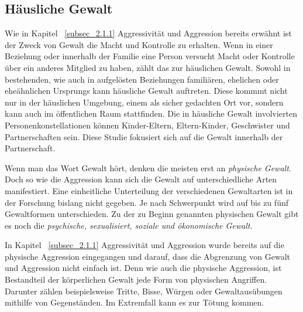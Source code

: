 \subsection{Häusliche Gewalt}    \label{subsec_2.1.2}
Wie in Kapitel ~\ref{subsec_2.1.1} Aggressivität und Aggression bereits erwähnt ist der Zweck von 
Gewalt die Macht und Kontrolle zu erhalten. %
Wenn in einer Beziehung oder innerhalb der Familie eine Person versucht Macht oder Kontrolle
über ein anderes Mitglied zu haben, zählt das zur häuslichen Gewalt. Sowohl in bestehenden, wie 
auch in aufgelösten Beziehungen familiären, ehelichen oder eheähnlichen Ursprungs kann häusliche
Gewalt auftreten. %
Diese kommmt nicht nur in der häuslichen Umgebung, einem als sicher gedachten Ort vor, sondern 
kann auch im öffentlichen Raum stattfinden. %
Die in häusliche Gewalt involvierten Personenkonstellationen können Kinder-Eltern, Eltern-Kinder,
Geschwister und Partnerschaften sein. %
Diese Studie fokusiert sich auf die Gewalt innerhalb der Partnerschaft.

Wenn man das Wort Gewalt hört, denken die meisten erst an \textit{physische Gewalt}. Doch so wie die 
Aggression kann sich die Gewalt auf unterschiedliche Arten manifestiert. Eine einheitliche 
Unterteilung der verschiedenen Gewaltarten ist in der Forschung bislang nicht gegeben. Je nach 
Schwerpunkt wird auf bis zu fünf Gewaltformen unterschieden. Zu der zu Beginn genannten physischen 
Gewalt gibt es noch die \textit{psychische, sexualisiert, soziale und ökonomische Gewalt}. %

In Kapitel ~\ref{subsec_2.1.1} Aggressivität und Aggression wurde bereits auf die physische 
Aggression eingegangen und darauf, dass die Abgrenzung von Gewalt und Aggression nicht einfach ist. 
Denn wie auch die physische Aggression, ist Bestandteil der körperlichen Gewalt jede Form von 
physischen Angriffen. %
Darunter zählen beispielsweise Tritte, Bisse, Würgen oder Gewaltausübungen mithilfe von Gegenständen.
Im Extremfall kann es zur Tötung kommen. %

